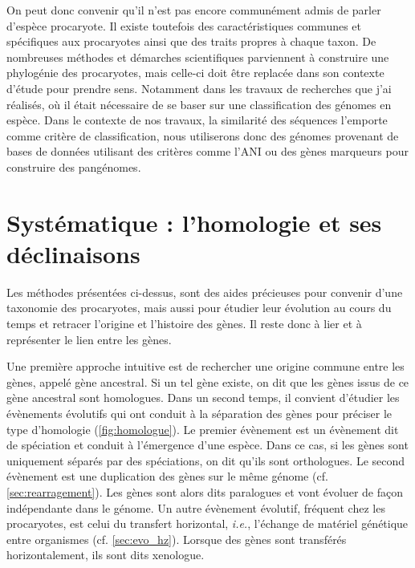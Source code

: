 On peut donc convenir qu'il n'est pas encore communément admis de parler d'espèce procaryote. Il existe toutefois des caractéristiques communes et spécifiques aux procaryotes ainsi que des traits propres à chaque taxon. De nombreuses méthodes et démarches scientifiques parviennent à construire une phylogénie des procaryotes, mais celle-ci doit être replacée dans son contexte d'étude pour prendre sens. Notamment dans les travaux de recherches que j'ai réalisés, où il était nécessaire de se baser sur une classification des génomes en espèce. Dans le contexte de nos travaux, la similarité des séquences l'emporte comme critère de classification, nous utiliserons donc des génomes provenant de bases de données utilisant des critères comme l'ANI ou des gènes marqueurs pour construire des pangénomes.


\section{Systématique : l'homologie et ses déclinaisons}

Les méthodes présentées ci-dessus, sont  des aides précieuses pour convenir d'une taxonomie des procaryotes, mais aussi pour étudier leur évolution au cours du temps et retracer l'origine et l'histoire des gènes. Il reste donc à lier et à représenter le lien entre les gènes. 

Une première approche intuitive est de rechercher une origine commune entre les gènes, appelé gène ancestral. Si un tel gène existe, on dit que les gènes issus de ce gène ancestral sont homologues. Dans un second temps, il convient d'étudier les évènements évolutifs qui ont conduit à la séparation des gènes pour préciser le type d'homologie (\autoref{fig:homologue}). 
Le premier évènement est un évènement dit de spéciation et conduit à l'émergence d'une espèce. Dans ce cas, si les gènes sont uniquement séparés par des spéciations, on dit qu'ils sont orthologues. Le second évènement est une duplication des gènes sur le même génome (cf. \autoref{sec:rearragement}). Les gènes sont alors dits paralogues et vont évoluer de façon indépendante dans le génome. Un autre évènement évolutif, fréquent chez les procaryotes, est celui du transfert horizontal, \textit{i.e.}, l'échange de matériel génétique entre organismes (cf. \autoref{sec:evo_hz}). Lorsque des gènes sont transférés horizontalement, ils sont dits xenologue.

